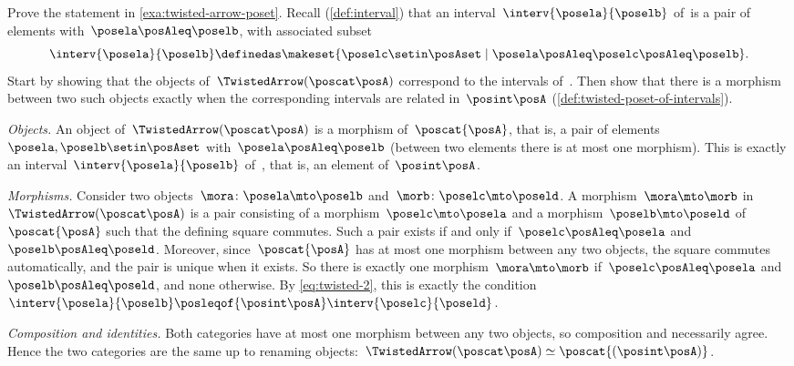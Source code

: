 \begin{exercise}
    \label{ex:twisted-arrow-poset}
    Prove the statement in \cref{exa:twisted-arrow-poset}.
    Recall (\cref{def:interval}) that an interval~$\interv{\posela}{\poselb}$ of~\posA is a pair of elements with~$\posela \posAleq \poselb$, with associated subset
    \begin{equation}
        \interv{\posela}{\poselb}
        \definedas \makeset{\poselc \setin \posAset \mid \posela \posAleq \poselc \posAleq \poselb}.
    \end{equation}
    Start by showing that the objects of~$\TwistedArrow (\poscat \posA)$ correspond to the intervals of~\posA.
    Then show that there is a morphism between two such objects exactly when the corresponding intervals are related in~$\posint\posA$ (\cref{def:twisted-poset-of-intervals}).
\end{exercise}
\begin{solution}
    \emph{Objects.}
    An object of~$\TwistedArrow (\poscat \posA)$ is a morphism of~$\poscat{\posA}$, that is, a pair of elements~$\posela, \poselb \setin \posAset$ with~$\posela \posAleq \poselb$ (between two elements there is at most one morphism).
    This is exactly an interval~$\interv{\posela}{\poselb}$ of~\posA, that is, an element of~$\posint\posA$.

    \emph{Morphisms.}
    Consider two objects~$\mora \colon \posela \mto \poselb$ and~$\morb \colon \poselc \mto \poseld$.
    A morphism~$\mora \mto \morb$ in~$\TwistedArrow (\poscat \posA)$ is a pair consisting of a morphism~$\poselc \mto \posela$ and a morphism~$\poselb \mto \poseld$ of~$\poscat{\posA}$ such that the defining square commutes.
    Such a pair exists if and only if~$\poselc \posAleq \posela$ and~$\poselb \posAleq \poseld$.
    Moreover, since~$\poscat{\posA}$ has at most one morphism between any two objects, the square commutes automatically, and the pair is unique when it exists.
    So there is exactly one morphism~$\mora \mto \morb$ if~$\poselc \posAleq \posela$ and~$\poselb \posAleq \poseld$, and none otherwise.
    By \cref{eq:twisted-2}, this is exactly the condition~$\interv{\posela}{\poselb} \posleqof{\posint\posA} \interv{\poselc}{\poseld}$.

    \emph{Composition and identities.}
    Both categories have at most one morphism between any two objects, so composition and  necessarily agree.
    Hence the two categories are the same up to renaming objects:~$\TwistedArrow (\poscat \posA) \simeq \poscat{(\posint\posA)}$.
\end{solution}

